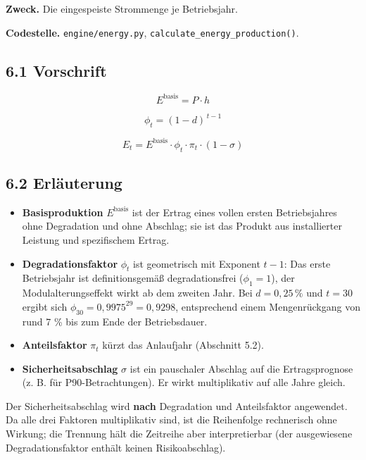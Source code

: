 \documentclass[
  a4paper,
  10pt]{article}
\providecommand{\tightlist}{%
  \setlength{\itemsep}{0pt}\setlength{\parskip}{0pt}}
\renewenvironment{quote}
  {\begin{tcolorbox}[
      enhanced,
      breakable,
      colback=Wash,
      colframe=Brand,
      boxrule=0pt,
      leftrule=2.2pt,
      arc=0pt,
      left=8pt,right=8pt,top=6pt,bottom=6pt,
      before skip=8pt,after skip=9pt
    ]\small\color{InkSoft}}
  {\end{tcolorbox}}
\begin{document}
\textbf{Zweck.} Die eingespeiste Strommenge je Betriebsjahr.

\textbf{Codestelle.} \nolinkurl{engine/energy.py},
\texttt{calculate\_energy\_production()}.

\hypertarget{vorschrift}{%
\subsection{6.1 Vorschrift}\label{vorschrift}}

\[ E^{\mathrm{basis}} = P \cdot h \]

\[ \phi_t = (1 - d)^{\,t-1} \]

\[ E_t = E^{\mathrm{basis}} \cdot \phi_t \cdot \pi_t \cdot (1 - \sigma) \]

\hypertarget{erluxe4uterung}{%
\subsection{6.2 Erläuterung}\label{erluxe4uterung}}

\begin{itemize}
\tightlist
\item
  \textbf{Basisproduktion} \(E^{\mathrm{basis}}\) ist der Ertrag eines
  vollen ersten Betriebsjahres ohne Degradation und ohne Abschlag; sie
  ist das Produkt aus installierter Leistung und spezifischem Ertrag.
\item
  \textbf{Degradationsfaktor} \(\phi_t\) ist geometrisch mit Exponent
  \(t-1\): Das erste Betriebsjahr ist definitionsgemäß degradationsfrei
  (\(\phi_1 = 1\)), der Modulalterungseffekt wirkt ab dem zweiten Jahr.
  Bei \(d = 0{,}25\,\%\) und \(t = 30\) ergibt sich
  \(\phi_{30} = 0{,}9975^{29} = 0{,}9298\), entsprechend einem
  Mengenrückgang von rund 7 \% bis zum Ende der Betriebsdauer.
\item
  \textbf{Anteilsfaktor} \(\pi_t\) kürzt das Anlaufjahr (Abschnitt 5.2).
\item
  \textbf{Sicherheitsabschlag} \(\sigma\) ist ein pauschaler Abschlag
  auf die Ertragsprognose (z. B. für P90-Betrachtungen). Er wirkt
  multiplikativ auf alle Jahre gleich.
\end{itemize}

\begin{quote}
Der Sicherheitsabschlag wird \textbf{nach} Degradation und Anteilsfaktor
angewendet. Da alle drei Faktoren multiplikativ sind, ist die
Reihenfolge rechnerisch ohne Wirkung; die Trennung hält die Zeitreihe
aber interpretierbar (der ausgewiesene Degradationsfaktor enthält keinen
Risikoabschlag).
\end{quote}
\end{document}
